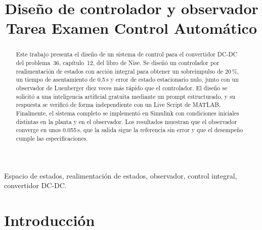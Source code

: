 \documentclass[conference,a4paper]{IEEEtran}
\begin{document}
\sloppy

\title{Diseño de controlador y observador\\ Tarea Examen Control Automático}

\author{
}

\maketitle

\begin{abstract}
Este trabajo presenta el diseño de un sistema de control para el convertidor DC-DC del problema~36, capítulo~12, del libro de Nise. Se diseñó un controlador por realimentación de estados con acción integral para obtener un sobreimpulso de 20\,\%, un tiempo de asentamiento de 0.5\,s y error de estado estacionario nulo, junto con un observador de Luenberger diez veces más rápido que el controlador. El diseño se solicitó a una inteligencia artificial gratuita mediante un prompt estructurado, y su respuesta se verificó de forma independiente con un Live Script de MATLAB. Finalmente, el sistema completo se implementó en Simulink con condiciones iniciales distintas en la planta y en el observador. Los resultados muestran que el observador converge en unos 0.055\,s, que la salida sigue la referencia sin error y que el desempeño cumple las especificaciones.
\end{abstract}

\begin{IEEEkeywords}
Espacio de estados, realimentación de estados, observador, control integral, convertidor DC-DC.
\end{IEEEkeywords}

\section{Introducción}
\end{document}
